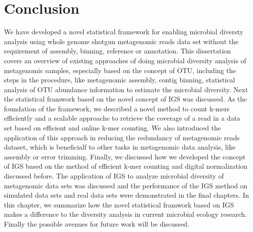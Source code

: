 %
%
%
%


\chapter{Conclusion}




We have developed a novel statistical framework for enabling microbial diversty
 analysis using whole genome shotgun metagenomic reads data set without the
requirement of assembly, binning, reference or annotation. This dissertation
covers an overview of existing approaches of doing microbial diversity analysis
 of metagenomic samples, especially based on the concept of OTU, including the
steps in the procedure, like metagenomic assembly, contig binning, statistical
analysis of OTU abundance information to estimate the microbial diversity. Next
the statistical framwork based on the novel concept of IGS was discussed. As
the foundation of the framework, we described a novel method to count k-mers
efficiently and a scalable approache to retrieve the coverage of a read in a 
data set based on efficient and online k-mer counting. We also introduced the
application of this approach in reducing the redundancy of metagenomic reads
dataset, which is beneficialf to other tasks in metagenomic data analysis, like
assembly or error trimming. Finally, we discussed how we developed the concept 
of IGS based on the method of efficient k-mer counting and digital
normalization discussed before.  
The application of IGS to analyze microbial diversity of metagenomic data sets 
was discussed and the performance of the IGS method on simulated data sets and
real data sets were demonstrated in the final chapters. In this chapter, we
summarize how the novel statistical framwork based on IGS makes a difference to
 the diversity analysis in current microbial ecology research. 
Finally the possible avenues for future work will be discussed.

